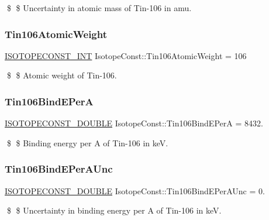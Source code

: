 \$ \$ Uncertainty in atomic mass of Tin-\/106 in amu. \mbox{\label{group___isotope_const-_tin-_sn106_ga2594415444d4d631cde9a1f736209f48}} 
\subsubsection{\texorpdfstring{Tin106\+Atomic\+Weight}{Tin106AtomicWeight}}
{\footnotesize\ttfamily \mbox{\hyperlink{group___isotope_const-_macros_ga5f18360b3e99483a35c32d789e62621c}{I\+S\+O\+T\+O\+P\+E\+C\+O\+N\+S\+T\+\_\+\+I\+NT}} Isotope\+Const\+::\+Tin106\+Atomic\+Weight = 106}

\$ \$ Atomic weight of Tin-\/106. \mbox{\label{group___isotope_const-_tin-_sn106_ga6a3f782d0348a9453335893a39430ee6}} 
\subsubsection{\texorpdfstring{Tin106\+Bind\+E\+PerA}{Tin106BindEPerA}}
{\footnotesize\ttfamily \mbox{\hyperlink{group___isotope_const-_macros_ga8f45a7272ce02c0b4c65c44636ed719a}{I\+S\+O\+T\+O\+P\+E\+C\+O\+N\+S\+T\+\_\+\+D\+O\+U\+B\+LE}} Isotope\+Const\+::\+Tin106\+Bind\+E\+PerA = 8432.}

\$ \$ Binding energy per A of Tin-\/106 in keV. \mbox{\label{group___isotope_const-_tin-_sn106_ga8c5e50fe7b372ff94d715aa22a4c95c6}} 
\subsubsection{\texorpdfstring{Tin106\+Bind\+E\+Per\+A\+Unc}{Tin106BindEPerAUnc}}
{\footnotesize\ttfamily \mbox{\hyperlink{group___isotope_const-_macros_ga8f45a7272ce02c0b4c65c44636ed719a}{I\+S\+O\+T\+O\+P\+E\+C\+O\+N\+S\+T\+\_\+\+D\+O\+U\+B\+LE}} Isotope\+Const\+::\+Tin106\+Bind\+E\+Per\+A\+Unc = 0.}

\$ \$ Uncertainty in binding energy per A of Tin-\/106 in keV. \mbox{\label{group___isotope_const-_tin-_sn106_ga4bf66f092af72ca73167733a544dea53}} 
